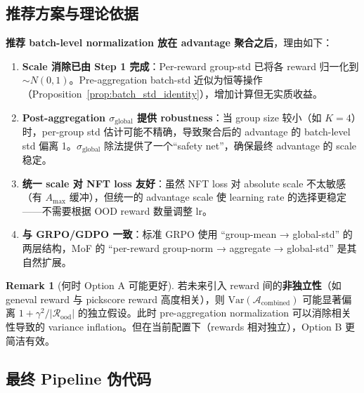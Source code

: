 \documentclass[11pt,a4paper]{article}
\theoremstyle{definition}
\newtheorem{remark}{Remark}
\begin{document}
\subsection{推荐方案与理论依据}

\begin{tcolorbox}[colback=blue!5, colframe=blue!50, title=推荐：Option B（After Aggregation）]
\textbf{推荐 batch-level normalization 放在 advantage 聚合\textbf{之后}}，理由如下：

\begin{enumerate}[leftmargin=1.5em]
\item \textbf{Scale 消除已由 Step 1 完成}：Per-reward group-std 已将各 reward 归一化到 $\sim N(0,1)$。Pre-aggregation batch-std 近似为恒等操作（Proposition~\ref{prop:batch_std_identity}），增加计算但无实质收益。

\item \textbf{Post-aggregation $\sigma_{\mathrm{global}}$ 提供 robustness}：当 group size 较小（如 $K = 4$）时，per-group std 估计可能不精确，导致聚合后的 advantage 的 batch-level std 偏离 1。$\sigma_{\mathrm{global}}$ 除法提供了一个``safety net''，确保最终 advantage 的 scale 稳定。

\item \textbf{统一 scale 对 NFT loss 友好}：虽然 NFT loss 对 absolute scale 不太敏感（有 $A_{\max}$ 缓冲），但统一的 advantage scale 使 learning rate 的选择更稳定——不需要根据 OOD reward 数量调整 lr。

\item \textbf{与 GRPO/GDPO 一致}：标准 GRPO 使用 ``group-mean → global-std'' 的两层结构，MoF 的 ``per-reward group-norm → aggregate → global-std'' 是其自然扩展。
\end{enumerate}
\end{tcolorbox}

\begin{remark}[何时 Option A 可能更好]
若未来引入 reward 间的\textbf{非独立性}（如 geneval reward 与 pickscore reward 高度相关），则 $\mathrm{Var}(\mathcal{A}_{\mathrm{combined}})$ 可能显著偏离 $1 + \gamma^2/|\mathcal{R}_{\mathrm{ood}}|$ 的独立假设。此时 pre-aggregation normalization 可以消除相关性导致的 variance inflation。但在当前配置下（rewards 相对独立），Option B 更简洁有效。
\end{remark}

\subsection{最终 Pipeline 伪代码}
\end{document}
